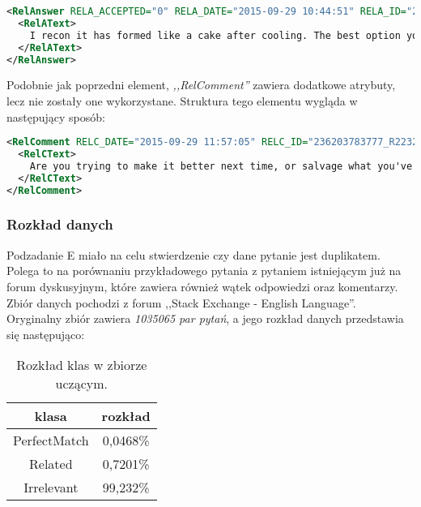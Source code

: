 \begin{lstlisting}[language=XML,breaklines,label={lst:subtask_e_rel_answer},caption={Przykład elementu ,,RelAnswer''.}]
<RelAnswer RELA_ACCEPTED="0" RELA_DATE="2015-09-29 10:44:51" RELA_ID="236203783777_R223248892008_A506889689755" RELA_RELEVANCE2ORGQ="" RELA_RELEVANCE2RELQ="" RELA_SCORE="0" RELA_USERID="37725" RELA_USERNAME="">
  <RelAText>
    I recon it has formed like a cake after cooling. The best option you have is to take a big chunk of it in a microwaveable container (making sure that you are not breaking the rice grains) and sprinkling with some water. Then cover with a cling film and microwave for 3-4 minutes from cold. Your rice grains will separate because of the extra moisture from the sprinkled water and the Pulao will become slightly moist.   But yes, Pulao is a dry dish and needs to be eaten with a side like Raita or Salan.
  </RelAText>
</RelAnswer>
\end{lstlisting}

Podobnie jak poprzedni element, \emph{,,RelComment''} zawiera dodatkowe atrybuty, lecz nie zostały one wykorzystane. Struktura tego elementu wygląda w następujący sposób:

\begin{lstlisting}[language=XML,breaklines,label={lst:subtask_e_rel_comment},caption={Przykład elementu ,,RelComment''.}]
<RelComment RELC_DATE="2015-09-29 11:57:05" RELC_ID="236203783777_R223248892008_C246533537180" RELC_RELEVANCE2ORGQ="" RELC_RELEVANCE2RELQ="" RELC_SCORE="1" RELC_USERID="17272" RELC_USERNAME="">
  <RelCText>
    Are you trying to make it better next time, or salvage what you've already made?
  </RelCText>
</RelComment>
\end{lstlisting}

\subsubsection{Rozkład danych}
Podzadanie E miało na celu stwierdzenie czy dane pytanie jest duplikatem. Polega to na porównaniu przykładowego pytania z pytaniem istniejącym już na forum dyskusyjnym, które zawiera również wątek odpowiedzi oraz komentarzy. Zbiór danych pochodzi z forum ,,Stack Exchange - English Language''.
Oryginalny zbiór zawiera \emph{1035065 par pytań}, a jego rozkład danych przedstawia się następująco:

\begin{table}[H]
\caption{Rozkład klas w zbiorze uczącym.}
\label{se_train_set_unmodified}
    \begin{center}
        \begin{tabular}{ |c|c| } 
            \hline
            klasa & rozkład\\
            \hline
            PerfectMatch & 0,0468\% \\
            \hline
            Related & 0,7201\% \\
            \hline
            Irrelevant & 99,232\% \\
            \hline
        \end{tabular}
    \end{center}
\end{table}

